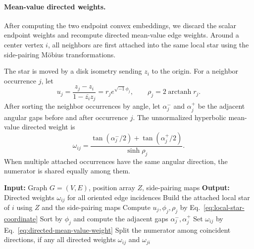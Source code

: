 \documentclass[12pt]{article}
\theoremstyle{definition}
\theoremstyle{remark}
\numberwithin{equation}{section}
\begin{document}
\paragraph{Mean-value directed weights.}
After computing the two endpoint convex embeddings, we discard the scalar endpoint weights and recompute directed mean-value edge weights. Around a center vertex $i$, all neighbors are first attached into the same local star using the side-pairing Möbius transformations.

The star is moved by a disk isometry sending $z_i$ to the origin. For a neighbor occurrence $j$, let
\begin{equation}
\label{eq:local-star-coordinate}
u_j=\frac{z_j-z_i}{1-\overline{z_i}z_j} = r_j e^{\sqrt{-1}\phi_j}, \qquad \rho_j=2\operatorname{arctanh} r_j.
\end{equation}
After sorting the neighbor occurrences by angle, let $\alpha_j^{-}$ and $\alpha_j^{+}$ be the adjacent angular gaps before and after occurrence $j$. The unnormalized hyperbolic mean-value directed weight is
\begin{equation}
\label{eq:directed-mean-value-weight}
\omega_{ij} = \frac{ \tan(\alpha_j^{-}/2)+\tan(\alpha_j^{+}/2) }{ \sinh \rho_j }.
\end{equation}
When multiple attached occurrences have the same angular direction, the numerator is shared equally among them.

\begin{algorithm}[H]
\caption{Directed mean-value weights on the attached local star}
\label{alg:directed-mean-value-weights}
\begin{algorithmic}[1]
\State \textbf{Input:} Graph $G=(V,E)$, position array $Z$, side-pairing maps
\State \textbf{Output:} Directed weights $\omega_{ij}$ for all oriented edge incidences
    \State Build the attached local star of $i$ using $Z$ and the side-pairing maps
        \State Compute $u_j,\phi_j,\rho_j$ by Eq.~\eqref{eq:local-star-coordinate}
    \EndFor
    \State Sort by $\phi_j$ and compute the adjacent gaps $\alpha_j^{-},\alpha_j^{+}$
        \State Set $\omega_{ij}$ by Eq.~\eqref{eq:directed-mean-value-weight}
        \State Split the numerator among coincident directions, if any
    \EndFor
\EndFor
\State \Return all directed weights $\omega_{ij}$ and $\omega_{ji}$
\end{algorithmic}
\end{algorithm}
\end{document}
